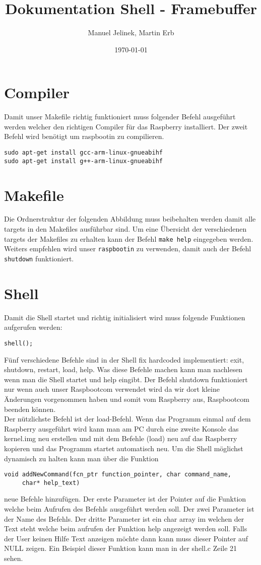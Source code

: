 \documentclass[a4paper,10pt]{scrartcl}
\title{Dokumentation Shell - Framebuffer}
\author{Manuel Jelinek, Martin Erb}
\date{\today}
\begin{document}
\maketitle
\section*{Compiler}
Damit unser Makefile richtig funktioniert muss folgender Befehl ausgeführt
werden welcher den richtigen Compiler für das Raspberry installiert.
Der zweit Befehl wird benötigt um raspbootin zu compilieren.
\begin{verbatim} 
sudo apt-get install gcc-arm-linux-gnueabihf 
sudo apt-get install g++-arm-linux-gnueabihf  
\end{verbatim}
\section*{Makefile}
Die Ordnerstruktur der folgenden Abbildung muss beibehalten werden damit
alle targets in den Makefiles ausführbar sind. Um eine Übersicht der
verschiedenen targets der Makefiles zu erhalten kann der Befehl \texttt{make
help} eingegeben werden.\\
Weiters empfehlen wird unser \texttt{raspbootin} zu verwenden, damit auch der 
Befehl \texttt{shutdown} funktioniert.
\newline

\section*{Shell}
Damit die Shell startet und richtig initialisiert wird muss folgende
Funktionen aufgerufen werden:
\begin{verbatim} 
shell();
\end{verbatim}
Fünf verschiedene Befehle sind in der Shell fix hardcoded implementiert:
exit, shutdown, restart, load, help.
Was diese Befehle machen kann man nachlesen wenn man die Shell startet und
help eingibt.
Der Befehl shutdown funktioniert nur wenn auch unser Raspbootcom verwendet wird
da wir dort kleine Änderungen vorgenommen
haben und somit vom Raspberry aus, Raspbootcom beenden können.\\
Der nützlichste Befehl ist der load-Befehl. Wenn das Programm einmal auf dem
Raspberry ausgeführt wird kann man am
PC durch eine zweite Konsole das kernel.img neu erstellen und mit dem Befehle
(load) neu auf das Raspberry kopieren und 
das Programm startet automatisch neu.
Um die Shell möglichst dynamisch zu halten kann man über die Funktion
\begin{verbatim} 
void addNewCommand(fcn_ptr function_pointer, char command_name,
     char* help_text)
\end{verbatim}
neue Befehle hinzufügen. Der erste Parameter ist der Pointer auf die Funktion
welche beim Aufrufen des Befehls ausgeführt werden soll.
Der zwei Parameter ist der Name des Befehls. Der dritte Parameter ist ein char
array im welchen der Text steht welche beim aufrufen der Funktion
help angezeigt werden soll. Falls der User keinen Hilfe Text anzeigen möchte
dann kann muss dieser Pointer auf NULL zeigen.
Ein Beispiel dieser Funktion kann man in der shell.c Zeile 21 sehen.
\end{document}
